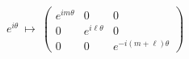 \begin{equation}
e^{i\theta}~\longmapsto~
\left(
\begin{array}{ccc}
 e^{im\theta}& 0  & 0 \\
 0& e^{i\ell\theta} & 0 \\
 0&0 & e^{-i(m+\ell)\theta}
\end{array}
\right)
\label{AW space}
\end{equation}


